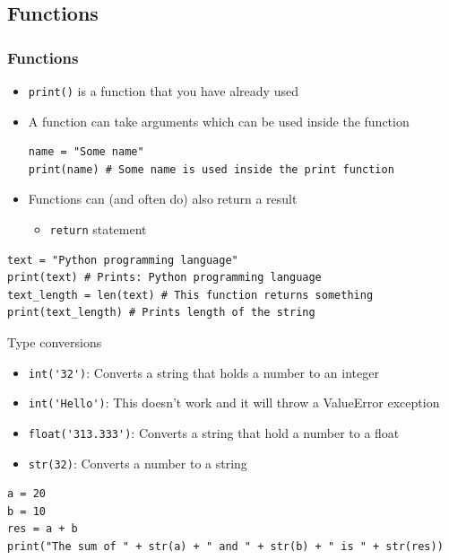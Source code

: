 \documentclass[10pt, a4paper]{beamer} %
\begin{document}
\subsection{Functions} %
\label{sub:functions}
\begin{frame}\frametitle{Functions}
\begin{itemize}
    \item \lstinline!print()! is a function that you have already used
    \item A function can take arguments which can be used inside the function
    \begin{lstlisting}
name = "Some name"
print(name) # Some name is used inside the print function
    \end{lstlisting}
    \item Functions can (and often do) also return a result
    \begin{itemize}
        \item \lstinline!return! statement
    \end{itemize}
\end{itemize}

\begin{examples}
    \begin{lstlisting}
text = "Python programming language"
print(text) # Prints: Python programming language
text_length = len(text) # This function returns something
print(text_length) # Prints length of the string
    \end{lstlisting}
\end{examples}
\framebreak
\begin{block}{Type conversions}
\begin{itemize}
    \item \lstinline!int('32')!: Converts a string that holds a number to an integer
    \item \lstinline!int('Hello')!: This doesn't work and it will throw a ValueError exception
    \item \lstinline!float('313.333')!: Converts a string that hold a number to a float
    \item \lstinline!str(32)!: Converts a number to a string
\end{itemize}

\begin{examples}
\begin{lstlisting}
a = 20
b = 10
res = a + b
print("The sum of " + str(a) + " and " + str(b) + " is " + str(res))
\end{lstlisting}
\end{examples}
\end{block}


\end{frame}
\end{document}
